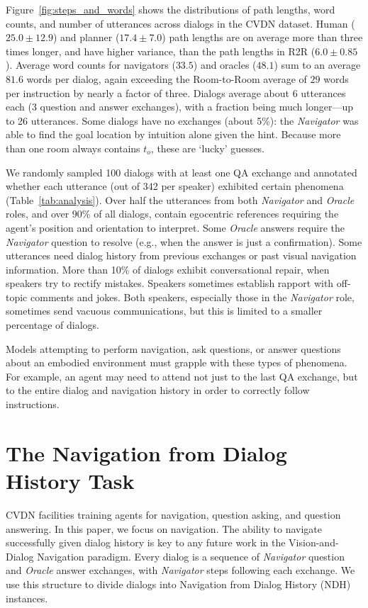 \documentclass{article}
\newcommand{\dataset}{CVDN}
\newcommand{\taskfull}{Navigation from Dialog History}
\newcommand{\task}{NDH}
\newcommand{\nav}{\textit{Navigator}}
\newcommand{\ora}{\textit{Oracle}}
\begin{document}
Figure~\ref{fig:steps_and_words} shows the distributions of path lengths, word counts, and number of utterances across dialogs in the \dataset{} dataset.
Human ($25.0\pm12.9$) and planner ($17.4\pm7.0$) path lengths are on average more than three times longer, and have higher variance, than the path lengths in R2R ($6.0\pm0.85$).
Average word counts for navigators ($33.5$) and oracles ($48.1$) sum to an average $81.6$ words per dialog, again exceeding the Room-to-Room average of $29$ words per instruction by nearly a factor of three.
Dialogs average about 6 utterances each (3 question and answer exchanges), with a fraction being much longer---up to 26 utterances.
Some dialogs have no exchanges (about 5\%): the \nav{} was able to find the goal location by intuition alone given the hint.
Because more than one room always contains $t_o$, these are `lucky' guesses.

We randomly sampled 100 dialogs with at least one QA exchange and annotated whether each utterance (out of 342 per speaker) exhibited certain phenomena (Table~\ref{tab:analysis}).
Over half the utterances from both \nav{} and \ora{} roles, and over 90\% of all dialogs, contain egocentric references requiring the agent's position and orientation to interpret.
Some \ora{} answers require the \nav{} question to resolve (e.g., when the answer is just a confirmation).
Some utterances need dialog history from previous exchanges or past visual navigation information.
More than 10\% of dialogs exhibit conversational repair, when speakers try to rectify mistakes.
Speakers sometimes establish rapport with off-topic comments and jokes.
Both speakers, especially those in the \nav{} role, sometimes send vacuous communications, but this is limited to a smaller percentage of dialogs.

Models attempting to perform navigation, ask questions, or answer questions about an embodied environment must grapple with these types of phenomena.
For example, an agent may need to attend not just to the last QA exchange, but to the entire dialog and navigation history in order to correctly follow instructions.
 
\section{The \taskfull{} Task}
\label{sec:task}

\dataset{} facilities training agents for navigation, question asking, and question answering.
In this paper, we focus on navigation.
The ability to navigate successfully given dialog history is key to any future work in the Vision-and-Dialog Navigation paradigm.
Every dialog is a sequence of \nav{} question and \ora{} answer exchanges, with \nav{} steps following each exchange.
We use this structure to divide dialogs into \taskfull{} (\task{}) instances.
\end{document}
